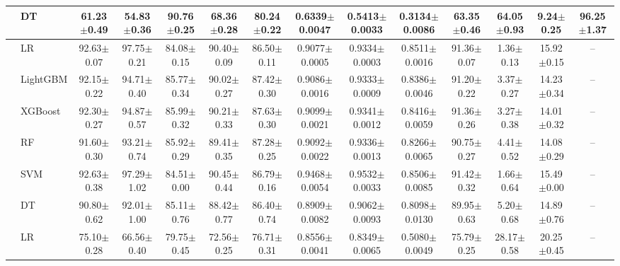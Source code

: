 \begin{tabular}{@{}llcccccccccccc@{}}
 & DT & 61.23{\tiny$\pm$0.49} & 54.83{\tiny$\pm$0.36} & 90.76{\tiny$\pm$0.25} & 68.36{\tiny$\pm$0.28} & 80.24{\tiny$\pm$0.22} & 0.6339{\tiny$\pm$0.0047} & 0.5413{\tiny$\pm$0.0033} & 0.3134{\tiny$\pm$0.0086} & 63.35{\tiny$\pm$0.46} & 64.05{\tiny$\pm$0.93} & 9.24{\tiny$\pm$0.25} & 96.25{\tiny$\pm$1.37}\\
\midrule
{} & LR & 92.63{\tiny$\pm$0.07} & 97.75{\tiny$\pm$0.21} & 84.08{\tiny$\pm$0.15} & 90.40{\tiny$\pm$0.09} & 86.50{\tiny$\pm$0.11} & 0.9077{\tiny$\pm$0.0005} & 0.9334{\tiny$\pm$0.0003} & 0.8511{\tiny$\pm$0.0016} & 91.36{\tiny$\pm$0.07} & 1.36{\tiny$\pm$0.13} & 15.92{\tiny$\pm$0.15} & --\\
 & LightGBM & 92.15{\tiny$\pm$0.22} & 94.71{\tiny$\pm$0.40} & 85.77{\tiny$\pm$0.34} & 90.02{\tiny$\pm$0.27} & 87.42{\tiny$\pm$0.30} & 0.9086{\tiny$\pm$0.0016} & 0.9333{\tiny$\pm$0.0009} & 0.8386{\tiny$\pm$0.0046} & 91.20{\tiny$\pm$0.22} & 3.37{\tiny$\pm$0.27} & 14.23{\tiny$\pm$0.34} & --\\
 & XGBoost & 92.30{\tiny$\pm$0.27} & 94.87{\tiny$\pm$0.57} & 85.99{\tiny$\pm$0.32} & 90.21{\tiny$\pm$0.33} & 87.63{\tiny$\pm$0.30} & 0.9099{\tiny$\pm$0.0021} & 0.9341{\tiny$\pm$0.0012} & 0.8416{\tiny$\pm$0.0059} & 91.36{\tiny$\pm$0.26} & 3.27{\tiny$\pm$0.38} & 14.01{\tiny$\pm$0.32} & --\\
 & RF & 91.60{\tiny$\pm$0.30} & 93.21{\tiny$\pm$0.74} & 85.92{\tiny$\pm$0.29} & 89.41{\tiny$\pm$0.35} & 87.28{\tiny$\pm$0.25} & 0.9092{\tiny$\pm$0.0022} & 0.9336{\tiny$\pm$0.0013} & 0.8266{\tiny$\pm$0.0065} & 90.75{\tiny$\pm$0.27} & 4.41{\tiny$\pm$0.52} & 14.08{\tiny$\pm$0.29} & --\\
 & SVM & 92.63{\tiny$\pm$0.38} & 97.29{\tiny$\pm$1.02} & 84.51{\tiny$\pm$0.00} & 90.45{\tiny$\pm$0.44} & 86.79{\tiny$\pm$0.16} & 0.9468{\tiny$\pm$0.0054} & 0.9532{\tiny$\pm$0.0033} & 0.8506{\tiny$\pm$0.0085} & 91.42{\tiny$\pm$0.32} & 1.66{\tiny$\pm$0.64} & 15.49{\tiny$\pm$0.00} & --\\
 & DT & 90.80{\tiny$\pm$0.62} & 92.01{\tiny$\pm$1.00} & 85.11{\tiny$\pm$0.76} & 88.42{\tiny$\pm$0.77} & 86.40{\tiny$\pm$0.74} & 0.8909{\tiny$\pm$0.0082} & 0.9062{\tiny$\pm$0.0093} & 0.8098{\tiny$\pm$0.0130} & 89.95{\tiny$\pm$0.63} & 5.20{\tiny$\pm$0.68} & 14.89{\tiny$\pm$0.76} & --\\
\midrule
{} & LR & 75.10{\tiny$\pm$0.28} & 66.56{\tiny$\pm$0.40} & 79.75{\tiny$\pm$0.45} & 72.56{\tiny$\pm$0.25} & 76.71{\tiny$\pm$0.31} & 0.8556{\tiny$\pm$0.0041} & 0.8349{\tiny$\pm$0.0065} & 0.5080{\tiny$\pm$0.0049} & 75.79{\tiny$\pm$0.25} & 28.17{\tiny$\pm$0.58} & 20.25{\tiny$\pm$0.45} & --\\

\end{tabular}

